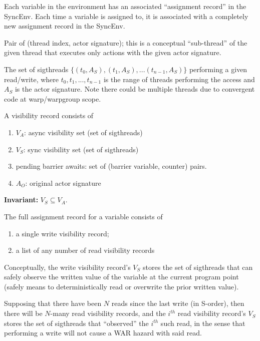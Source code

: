 \filbreak
{} Each variable in the environment has an associated ``assignment record'' in the SyncEnv.
Each time a variable is assigned to, it is associated with a completely new assignment record in the SyncEnv.

\filbreak
{} Pair of (thread index, actor signature); this is a conceptual ``sub-thread'' of the given thread that executes only actions with the given actor signature.

\filbreak
{}
The set of sigthreads $\{(t_0, A_S), (t_1, A_S), ... (t_{n-1}, A_S)\}$ performing a given read/write, where $t_0, t_1, ... ,t_{n-1}$ is the range of threads performing the access and $A_S$ is the actor signature.
Note there could be multiple threads due to convergent code at warp/warpgroup scope.

\filbreak
{} A visibility record consists of
\begin{enumerate}
  \item $V_A$: async visibility set (set of sigthreads)
  \item $V_S$: sync visibility set (set of sigthreads)
  \item pending barrier awaits: set of (barrier variable, counter) pairs.
  \item $A_O$: original actor signature
\end{enumerate}

\textbf{Invariant:} $V_S \subseteq V_A$.

\filbreak
{} The full assignment record for a variable consists of
\begin{enumerate}
  \item a single write visibility record;
  \item a list of any number of read visibility records
\end{enumerate}

\filbreak
Conceptually, the write visibility record's $V_S$ stores the set of sigthreads that can safely observe the written value of the variable at the current program point (safely means to deterministically read or overwrite the prior written value).

\filbreak
Supposing that there have been $N$ reads since the last write (in S-order), then there will be $N$-many read visibility records, and the $i^{th}$ read visibility record's $V_S$ stores the set of sigthreads that ``observed'' the $i^{th}$ such read, in the sense that performing a write will not cause a WAR hazard with said read.

